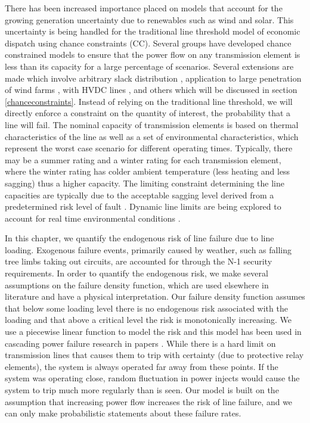There has been increased importance placed on models that account for the growing generation uncertainty due to renewables such as wind and solar.  This uncertainty is being  handled for the traditional line threshold model of economic dispatch using chance constraints (CC).  Several groups have developed chance constrained models to ensure that the power flow on any transmission element is less than its capacity for a large percentage of scenarios.  Several extensions are made which involve arbitrary slack distribution \cite{bienstock_2012}, application to large penetration of wind farms \cite{vrakopoulou_2013b}, with HVDC lines \cite{vrakopoulou_2013}, and others \cite{roald_2013,vrakopoulou_2013c} which will be discussed in section \ref{chanceconstraints}.  Instead of relying on the traditional line threshold, we will directly enforce a constraint on the quantity of interest, the probability that a line will fail. The nominal capacity of transmission elements is based on thermal characteristics of the line as well as a set of environmental characteristics, which represent the worst case scenario for different operating times.  Typically, there may be a summer rating and a winter rating for each transmission element, where the winter rating has colder ambient temperature (less heating and less sagging) thus a higher capacity.  The limiting constraint determining the line capacities are typically due to the acceptable sagging level derived from a predetermined risk level of fault \cite{seppa_2007}.  Dynamic line limits are being explored to account for real time environmental conditions \cite{bucher_2013,wang_2011,yip_2009,zhang_2002}.  

In this chapter, we quantify the endogenous risk of line failure due to line loading.  Exogenous failure events, primarily caused by weather, such as falling tree limbs taking out circuits, are accounted for through the N-1 security requirements.  In order to quantify the endogenous risk, we make several assumptions on the failure density function, which are used elsewhere in literature and have a physical interpretation.  Our failure density function assumes that below some loading level there is no endogenous risk associated with the loading and that above a critical level the risk is monotonically increasing.  We use a piecewise linear function to model the risk and this model has been used in cascading power failure research in papers \cite{carreras_2002,chen_2005,dobson_2007,hines_2011,newman_2011}.  While there is a hard limit on transmission lines that causes them to trip with certainty (due to protective relay elements), the system is always operated far away from these points.  If the system was operating close, random fluctuation in power injects would cause the system to trip much more regularly than is seen.  Our model is built on the assumption that increasing power flow increases the risk of line failure, and we can only make probabilistic statements about these failure rates. 


